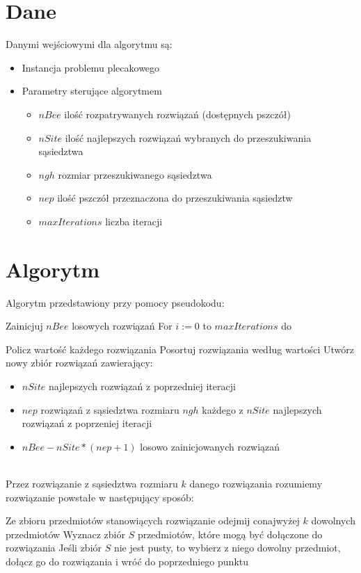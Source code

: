 \documentclass[a4paper,12pt,notitlepage]{mwrep}
\begin{document}
\section{Dane}
Danymi wejściowymi dla algorytmu są:
\begin{itemize}
\item Instancja problemu plecakowego
\item Parametry sterujące algorytmem
\begin{itemize}
\item $nBee$ ilość rozpatrywanych rozwiązań (dostępnych pszczół)
\item $nSite$ ilość najlepszych rozwiązań wybranych do przeszukiwania sąsiedztwa
\item $ngh$ rozmiar przeszukiwanego sąsiedztwa
\item $nep$ ilość pszczół przeznaczona do przeszukiwania sąsiedztw
\item $maxIterations$ liczba iteracji
\end{itemize}
\end{itemize}

\section{Algorytm}
Algorytm przedstawiony przy pomocy pseudokodu:
\begin{enumerate}
	\fe Zainicjuj $nBee$ losowych rozwiązań
	\fe For $i:=0$ to $maxIterations$ do
		\begin{enumerate}
			\fe Policz wartość każdego rozwiązania
			\fe Posortuj rozwiązania według wartości
			\fe Utwórz nowy zbiór rozwiązań zawierający:
				\begin{itemize}
				\item $nSite$ najlepszych rozwiązań z poprzedniej iteracji
				\item $nep$ rozwiązań z sąsiedztwa rozmiaru $ngh$ każdego z $nSite$
				najlepszych rozwiązań z poprzeniej iteracji
				\item $nBee-nSite*(nep+1)$ losowo zainicjowanych rozwiązań
				\end{itemize}
		\end{enumerate}
\end{enumerate}

\ \\Przez rozwiązanie z sąsiedztwa rozmiaru $k$ danego rozwiązania rozumiemy
rozwiązanie powstałe w następujący sposób:
\begin{enumerate}
	\fe Ze zbioru przedmiotów stanowiących rozwiązanie odejmij
	conajwyżej $k$ dowolnych przedmiotów
	\fe Wyznacz zbiór $S$ przedmiotów, które mogą być dołączone do rozwiązania
	\fe Jeśli zbiór $S$ nie jest pusty, to wybierz z niego dowolny przedmiot, dołącz
	go do rozwiązania i wróć do poprzedniego punktu
\end{enumerate}
\end{document}
